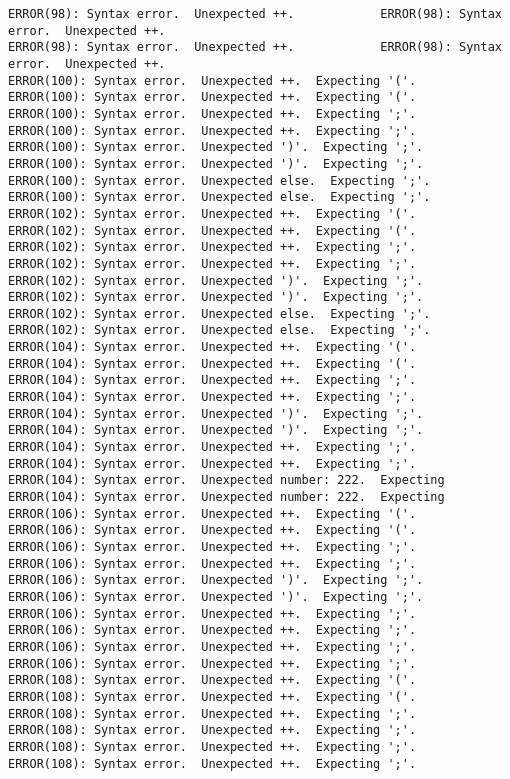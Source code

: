\documentclass[12pt]{book}
\begin{document}
\begin{lstlisting}
ERROR(98): Syntax error.  Unexpected ++.			ERROR(98): Syntax error.  Unexpected ++.
ERROR(98): Syntax error.  Unexpected ++.			ERROR(98): Syntax error.  Unexpected ++.
ERROR(100): Syntax error.  Unexpected ++.  Expecting '('.	ERROR(100): Syntax error.  Unexpected ++.  Expecting '('.
ERROR(100): Syntax error.  Unexpected ++.  Expecting ';'.	ERROR(100): Syntax error.  Unexpected ++.  Expecting ';'.
ERROR(100): Syntax error.  Unexpected ')'.  Expecting ';'.	ERROR(100): Syntax error.  Unexpected ')'.  Expecting ';'.
ERROR(100): Syntax error.  Unexpected else.  Expecting ';'.	ERROR(100): Syntax error.  Unexpected else.  Expecting ';'.
ERROR(102): Syntax error.  Unexpected ++.  Expecting '('.	ERROR(102): Syntax error.  Unexpected ++.  Expecting '('.
ERROR(102): Syntax error.  Unexpected ++.  Expecting ';'.	ERROR(102): Syntax error.  Unexpected ++.  Expecting ';'.
ERROR(102): Syntax error.  Unexpected ')'.  Expecting ';'.	ERROR(102): Syntax error.  Unexpected ')'.  Expecting ';'.
ERROR(102): Syntax error.  Unexpected else.  Expecting ';'.	ERROR(102): Syntax error.  Unexpected else.  Expecting ';'.
ERROR(104): Syntax error.  Unexpected ++.  Expecting '('.	ERROR(104): Syntax error.  Unexpected ++.  Expecting '('.
ERROR(104): Syntax error.  Unexpected ++.  Expecting ';'.	ERROR(104): Syntax error.  Unexpected ++.  Expecting ';'.
ERROR(104): Syntax error.  Unexpected ')'.  Expecting ';'.	ERROR(104): Syntax error.  Unexpected ')'.  Expecting ';'.
ERROR(104): Syntax error.  Unexpected ++.  Expecting ';'.	ERROR(104): Syntax error.  Unexpected ++.  Expecting ';'.
ERROR(104): Syntax error.  Unexpected number: 222.  Expecting	ERROR(104): Syntax error.  Unexpected number: 222.  Expecting
ERROR(106): Syntax error.  Unexpected ++.  Expecting '('.	ERROR(106): Syntax error.  Unexpected ++.  Expecting '('.
ERROR(106): Syntax error.  Unexpected ++.  Expecting ';'.	ERROR(106): Syntax error.  Unexpected ++.  Expecting ';'.
ERROR(106): Syntax error.  Unexpected ')'.  Expecting ';'.	ERROR(106): Syntax error.  Unexpected ')'.  Expecting ';'.
ERROR(106): Syntax error.  Unexpected ++.  Expecting ';'.	ERROR(106): Syntax error.  Unexpected ++.  Expecting ';'.
ERROR(106): Syntax error.  Unexpected ++.  Expecting ';'.	ERROR(106): Syntax error.  Unexpected ++.  Expecting ';'.
ERROR(108): Syntax error.  Unexpected ++.  Expecting '('.	ERROR(108): Syntax error.  Unexpected ++.  Expecting '('.
ERROR(108): Syntax error.  Unexpected ++.  Expecting ';'.	ERROR(108): Syntax error.  Unexpected ++.  Expecting ';'.
ERROR(108): Syntax error.  Unexpected ++.  Expecting ';'.	ERROR(108): Syntax error.  Unexpected ++.  Expecting ';'.

\end{lstlisting}
\end{document}
